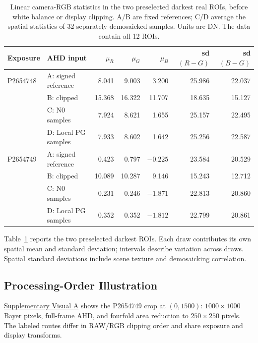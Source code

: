 \documentclass[10pt,twocolumn,journal]{IEEEtran}
\begin{document}
\begin{table}[t]
\centering
\caption{Linear camera-RGB statistics in the two preselected darkest real ROIs, before white balance or display clipping. A/B are fixed references; C/D average the spatial statistics of 32 separately demosaicked samples. Units are DN. The data contain all 12 ROIs.}
\label{tab:ahd}
\begin{tabular}{@{}llrrrrr@{}}
\toprule
Exposure & AHD input & $\mu_R$ & $\mu_G$ & $\mu_B$ & sd$(R-G)$ & sd$(B-G)$\\
\midrule
P2654748 & A: signed reference & 8.041 & 9.003 & 3.200 & 25.986 & 22.037\\
& B: clipped & 15.368 & 16.322 & 11.707 & 18.635 & 15.127\\
& C: N0 samples & 7.924 & 8.621 & 1.655 & 25.157 & 22.495\\
& D: Local PG samples & 7.933 & 8.602 & 1.642 & 25.256 & 22.587\\
P2654749 & A: signed reference & 0.423 & 0.797 & $-0.225$ & 23.584 & 20.529\\
& B: clipped & 10.089 & 10.287 & 9.146 & 15.243 & 12.712\\
& C: N0 samples & 0.231 & 0.246 & $-1.871$ & 22.813 & 20.860\\
& D: Local PG samples & 0.352 & 0.352 & $-1.812$ & 22.799 & 20.861\\
\bottomrule
\end{tabular}
\end{table}

Table~\ref{tab:ahd} reports the two preselected darkest ROIs. Each draw contributes its own spatial mean and standard deviation; intervals describe variation across draws. Spatial standard deviations include scene texture and demosaicking correlation.



\subsection{Processing-Order Illustration}
\href{visual_en.pdf}{Supplementary Visual A} shows the P2654749 crop at $(0,1500)$: $1000\times1000$ Bayer pixels, full-frame AHD, and fourfold area reduction to $250\times250$ pixels. The labeled routes differ in RAW/RGB clipping order and share exposure and display transforms.
\end{document}
